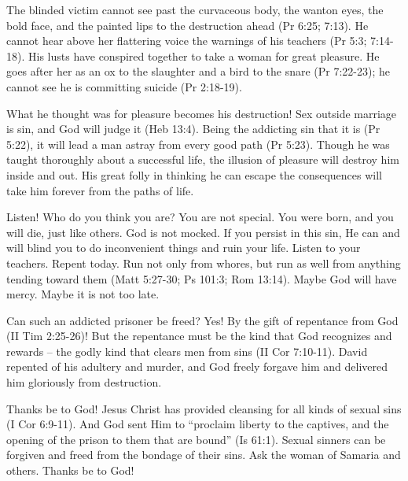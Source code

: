 The blinded victim cannot see past the curvaceous body, the wanton eyes, the bold face, and the painted lips to the destruction ahead (Pr 6:25; 7:13). He cannot hear above her flattering voice the warnings of his teachers (Pr 5:3; 7:14-18). His lusts have conspired together to take a woman for great pleasure. He goes after her as an ox to the slaughter and a bird to the snare (Pr 7:22-23); he cannot see he is committing suicide (Pr 2:18-19).

What he thought was for pleasure becomes his destruction! Sex outside marriage is sin, and God will judge it (Heb 13:4). Being the addicting sin that it is (Pr 5:22), it will lead a man astray from every good path (Pr 5:23). Though he was taught thoroughly about a successful life, the illusion of pleasure will destroy him inside and out. His great folly in thinking he can escape the consequences will take him forever from the paths of life.

Listen! Who do you think you are? You are not special. You were born, and you will die, just like others. God is not mocked. If you persist in this sin, He can and will blind you to do inconvenient things and ruin your life. Listen to your teachers. Repent today. Run not only from whores, but run as well from anything tending toward them (Matt 5:27-30; Ps 101:3; Rom 13:14). Maybe God will have mercy. Maybe it is not too late.

Can such an addicted prisoner be freed? Yes! By the gift of repentance from God (II Tim 2:25-26)! But the repentance must be the kind that God recognizes and rewards – the godly kind that clears men from sins (II Cor 7:10-11). David repented of his adultery and murder, and God freely forgave him and delivered him gloriously from destruction.

Thanks be to God! Jesus Christ has provided cleansing for all kinds of sexual sins (I Cor 6:9-11). And God sent Him to “proclaim liberty to the captives, and the opening of the prison to them that are bound” (Is 61:1). Sexual sinners can be forgiven and freed from the bondage of their sins. Ask the woman of Samaria and others. Thanks be to God!











